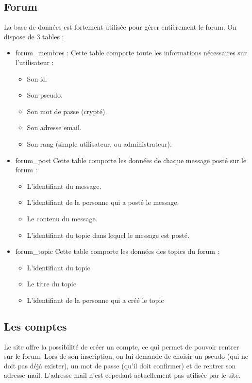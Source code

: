 \documentclass[a4paper, 12pt]{article}
\begin{document}
\subsection{Forum}
La base de données est fortement utilisée pour gérer entièrement le forum. On dispose de 3 tables :
\begin{itemize}
\item forum\_membres :
  Cette table comporte toute les informations nécessaires sur l'utilisateur :
  \begin{itemize}
  \item Son id.
  \item Son pseudo.
  \item Son mot de passe (crypté).
  \item Son adresse email.
  \item Son rang (simple utilisateur, ou administrateur).
  \end{itemize}

\item forum\_post
  Cette table comporte les données de chaque message posté sur le forum :
  \begin{itemize}
  \item L'identifiant du message.
  \item L'identifiant de la personne qui a posté le message.
  \item Le contenu du message.
  \item L'identifiant du topic dans lequel le message est posté.
  \end{itemize}

\item forum\_topic
  Cette table comporte les données des topics du forum :
  \begin{itemize}
  \item L'identifiant du topic
  \item Le titre du topic
  \item L'identifiant de la personne qui a créé le topic
  \end{itemize}
\end{itemize}

\subsection{Les comptes}
Le site offre la possibilité de créer un compte, ce qui permet de pouvoir rentrer sur le forum.
Lors de son inscription, on lui demande de choisir un pseudo (qui ne doit pas déjà exister), un mot de passe (qu'il doit confirmer) et de rentrer son adresse mail. L'adresse mail n'est cepedant actuellement pas utilisée par le site.
\end{document}
